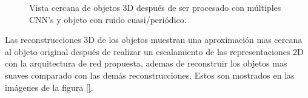 \documentclass[10pt,letterpaper]{article}
\begin{document}
\begin{figure}[H]
\begin{center}
{            \label{tif162}}
        \caption{Vista cercana de objetos 3D después de ser procesado con múltiples CNN's y objeto con ruido cuasi/periódico.}
        \label{tif158159160161162163}
      \end{center}
\end{figure}

Las reconstrucciones 3D de los objetos muestran una aproximación mas cercana al objeto original después de realizar un escalamiento de las representaciones 2D con la arquitectura de red propuesta, ademas de reconstruir los objetos mas suaves comparado con las demás reconstrucciones. Estos son mostrados en las imágenes de la figura \ref{}.
\end{document}
